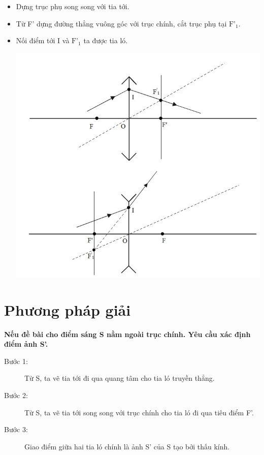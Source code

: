 \begin{itemize}
	\item Dựng trục phụ song song với tia tới.
	\item Từ F' dựng đường thẳng vuông góc  với trục chính, cắt trục phụ tại $\text{F'}_1$.
	\item Nối điểm tới I và $\text{F'}_1$ ta được tia ló.
	\begin{center}
		\includegraphics[scale=0.7]{../figs/VN11-PH-38-A-004-1-h26.jpg}
	\end{center} 
	
\end{itemize}
\section{Phương pháp giải}
		\textbf{Nếu đề bài cho điểm sáng S nằm ngoài trục chính. Yêu cầu xác định điểm ảnh S'.}
		\begin{description}
		
					\item[Bước 1:] Từ S, ta vẽ tia tới đi qua quang tâm cho tia ló truyền thẳng.
					\item[Bước 2:] Từ S, ta vẽ tia tới song song với trục chính cho tia ló đi qua tiêu điểm F'.
					\item[Bước 3:] Giao điểm giữa hai tia ló chính là ảnh S' của S tạo bởi thấu kính.
\end{description}

